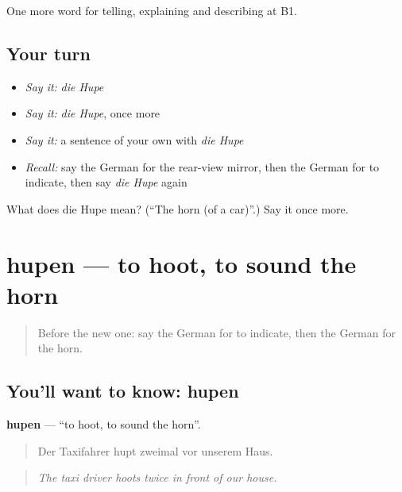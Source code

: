 \begin{grammarlens}[title={What you've built}]
One more word for telling, explaining and describing at B1.
\end{grammarlens}

\subsection*{Your turn}
\begin{itemize}
\raggedright
  \item \emph{Say it:} \emph{die Hupe}
  \item \emph{Say it:} \emph{die Hupe}, once more
  \item \emph{Say it:} a sentence of your own with \emph{die Hupe}
  \item \emph{Recall:} say the German for the rear-view mirror, then the German for to indicate, then say \emph{die Hupe} again
\end{itemize}

\begin{tcolorbox}[breakable,colback=teal!4,colframe=teal!35!black,title={Before you move on}]
What does die Hupe mean? (\textquotedblleft{}The horn (of a car)\textquotedblright{}.) Say it once more.
\end{tcolorbox}
\section[hupen]{hupen — to hoot, to sound the horn}

\label{lesson:GE-C401-hupen}



\begin{quote}
Before the new one: say the German for to indicate, then the German for the horn.
\end{quote}

\subsection*{You'll want to know: hupen}
\textbf{hupen} — \textquotedblleft{}to hoot, to sound the horn\textquotedblright{}.

\begin{quote}
Der Taxifahrer hupt zweimal vor unserem Haus.
\end{quote}

\begin{quote}
\emph{The taxi driver hoots twice in front of our house.}
\end{quote}

